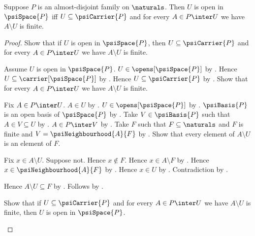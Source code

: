 \begin{theorem}\label{psi_open_iff}
    Suppose $P$ is an almost-disjoint family on $\naturals$.
    Then $U$ is open in $\psiSpace{P}$ iff
        $U\subseteq\psiCarrier{P}$ and
        for every $A\in P\inter U$ we have $A\setminus U$ is finite.
\end{theorem}
\begin{proof}
    Show that if $U$ is open in $\psiSpace{P}$, then
        $U\subseteq\psiCarrier{P}$ and
        for every $A\in P\inter U$ we have $A\setminus U$ is finite.
    \begin{subproof}
        Assume $U$ is open in $\psiSpace{P}$.
        $U\in\opens[\psiSpace{P}]$ by .
        Hence $U\subseteq\carrier[\psiSpace{P}]$ by .
        Hence $U\subseteq\psiCarrier{P}$ by .
        Show that for every $A\in P\inter U$ we have
            $A\setminus U$ is finite.
        \begin{subproof}
            Fix $A\in P\inter U$.
            $A\in U$ by .
            $U\in\opens[\psiSpace{P}]$ by .
            $\psiBasis{P}$ is an open basis of $\psiSpace{P}$
                by .
            Take $V\in\psiBasis{P}$ such that $A\in V\subseteq U$
                by .
            $A\in P\inter V$ by .
            Take $F$ such that $F\subseteq\naturals$ and $F$ is finite
                and $V=\psiNeighbourhood{A}{F}$
                by .
            Show that every element of $A\setminus U$ is an element of $F$.
            \begin{subproof}
                Fix $x\in A\setminus U$.
                Suppose not.
                Hence $x\notin F$.
                Hence $x\in A\setminus F$ by .
                Hence $x\in\psiNeighbourhood{A}{F}$
                    by .
                Hence $x\in U$ by .
                Contradiction by .
            \end{subproof}
            Hence $A\setminus U\subseteq F$ by .
            Follows by .
        \end{subproof}
    \end{subproof}
    Show that if $U\subseteq\psiCarrier{P}$ and
        for every $A\in P\inter U$ we have $A\setminus U$ is finite,
        then $U$ is open in $\psiSpace{P}$.
    \begin{subproof}

\end{subproof}
\end{proof}
